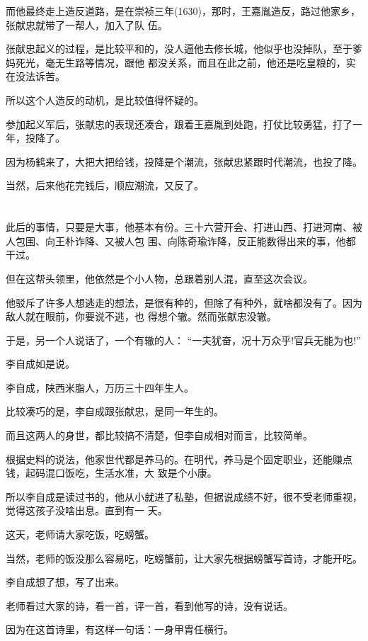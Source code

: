 \documentclass[11pt,a4paper,onecolumn]{article}
\begin{document}
而他最终走上造反道路，是在崇祯三年(1630)，那时，王嘉胤造反，路过他家乡，张献忠就带了一帮人，加入了队
伍。

张献忠起义的过程，是比较平和的，没人逼他去修长城，他似乎也没掉队，至于爹妈死光，毫无生路等情况，跟他
都没关系，而且在此之前，他还是吃皇粮的，实在没法诉苦。

所以这个人造反的动机，是比较值得怀疑的。

参加起义军后，张献忠的表现还凑合，跟着王嘉胤到处跑，打仗比较勇猛，打了一年，投降了。

因为杨鹤来了，大把大把给钱，投降是个潮流，张献忠紧跟时代潮流，也投了降。

当然，后来他花完钱后，顺应潮流，又反了。

\section[\thesection]{}

此后的事情，只要是大事，他基本有份。三十六营开会、打进山西、打进河南、被人包围、向王朴诈降、又被人包
围、向陈奇瑜诈降，反正能数得出来的事，他都干过。

但在这帮头领里，他依然是个小人物，总跟着别人混，直至这次会议。

他驳斥了许多人想逃走的想法，是很有种的，但除了有种外，就啥都没有了。因为敌人就在眼前，你要说不逃，也
得想个辙。然而张献忠没辙。

于是，另一个人说话了，一个有辙的人： ``一夫犹奋，况十万众乎!官兵无能为也!''

李自成如是说。

李自成，陕西米脂人，万历三十四年生人。

比较凑巧的是，李自成跟张献忠，是同一年生的。

而且这两人的身世，都比较搞不清楚，但李自成相对而言，比较简单。

根据史料的说法，他家世代都是养马的。在明代，养马是个固定职业，还能赚点钱，起码混口饭吃，生活水准，大
致是个小康。

所以李自成是读过书的，他从小就进了私塾，但据说成绩不好，很不受老师重视，觉得这孩子没啥出息。直到有一
天。

这天，老师请大家吃饭，吃螃蟹。

当然，老师的饭没那么容易吃，吃螃蟹前，让大家先根据螃蟹写首诗，才能开吃。

李自成想了想，写了出来。

老师看过大家的诗，看一首，评一首，看到他写的诗，没有说话。

因为在这首诗里，有这样一句话：一身甲胄任横行。
\end{document}

